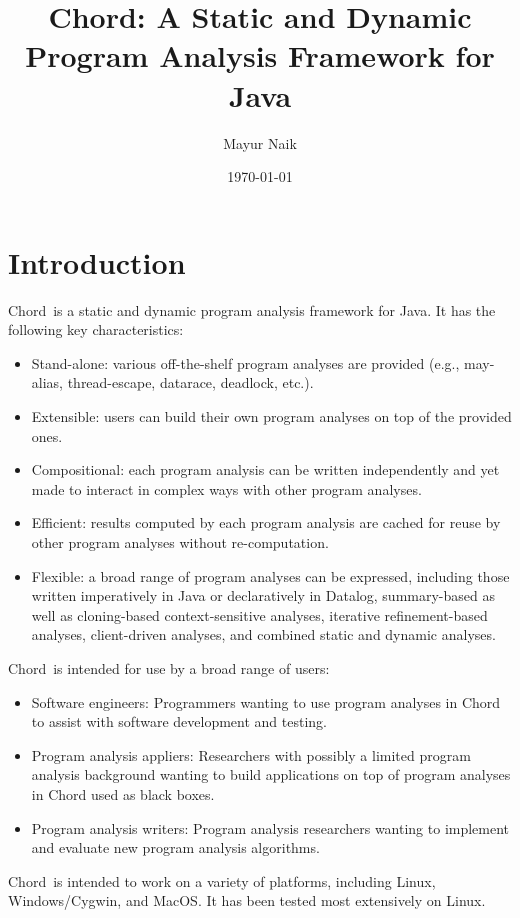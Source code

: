 \documentclass{article}
\title{Chord: A Static and Dynamic Program Analysis Framework for Java}
\author{Mayur Naik}
\date{\today}
\providecommand\Chord{Chord}
\begin{document}
\maketitle
\texonly{\tableofcontents}

\texonly{\newpage}
\section{Introduction}

\Chord\ is a static and dynamic program analysis framework for Java.
It has the following key characteristics:

\begin{itemize}
\item
Stand-alone: various off-the-shelf program analyses are provided (e.g., may-alias, thread-escape, datarace, deadlock, etc.).
\item
Extensible: users can build their own program analyses on top of the provided ones.
\item
Compositional: each program analysis can be written independently and yet made to interact in complex ways with other program analyses.
\item
Efficient: results computed by each program analysis are cached for reuse by other program analyses without re-computation.
\item
Flexible: a broad range of program analyses can be expressed, including those
written imperatively in Java or declaratively in Datalog, summary-based as well as cloning-based context-sensitive analyses,
iterative refinement-based analyses, client-driven analyses, and combined static and dynamic analyses.
\end{itemize}

\Chord\ is intended for use by a broad range of users:

\begin{itemize}
\item
Software engineers: Programmers wanting to use program analyses in Chord to assist with software development and testing.
\item
Program analysis appliers: Researchers with possibly a limited program analysis background wanting to build applications on top of program analyses in Chord used as black boxes.
\item
Program analysis writers: Program analysis researchers wanting to implement and evaluate new program analysis algorithms.
\end{itemize}

\Chord\ is intended to work on a variety of platforms, including Linux, Windows/Cygwin, and MacOS.
It has been tested most extensively on Linux.
\end{document}
